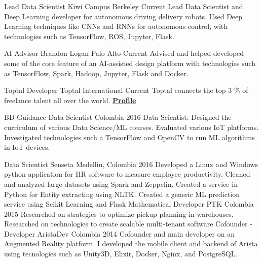 \begin{cventries}

  \cventry
    {Lead Data Scientist}
    {Kiwi Campus}
    {Berkeley}
    {Current}
    {
    Lead Data Scientist and Deep Learning developer for autonomous driving delivery robots. Used
    Deep Learning techniques like CNNs and RNNs for autonomous control,
    with technologies such as TensorFlow, ROS, Jupyter, Flask.
    }

  \cventry
    {AI Advisor}
    {Brandon Logan}
    {Palo Alto}
    {Current}
    {
    Advised and helped developed some of the core feature of an AI-assisted design platform
    with technologies such as TensorFlow, Spark, Hadoop, Jupyter, Flask and Docker.
    }

  \cventry
    {Toptal Developer }
    {Toptal}
    {International}
    { Current}
    {
      Toptal connects the top 3 \% of freelance talent all over the world. \href{https://www.toptal.com/resume/cristian-garcia}{\textbf{Profile}}
    }

  \cventry
    {BD Guidance}
    {Data Scientist}
    {Colombia}
    {2016}
    {
    Data Scientist: Designed the curriculum of various
    Data Science/ML courses. Evaluated various IoT platforms. Investigated
    technologies such a TensorFlow and OpenCV to run ML algorithms in IoT
    devices.
    }

  \cventry
    {Data Scientist}
    {Senseta}
    {Medellin, Colombia}
    {2016}
    {
    Developed a Linux and Windows python
    application for HR software to measure employee productivity. Cleaned
    and analyzed large datasets using Spark and Zeppelin. Created a service in
    Python for Entity extracting using NLTK. Created a generic ML prediction
    service using Scikit Learning and Flask
    }
  \cventry
    {Mathematical Developer}
    {PTK}
    {Colombia}
    {2015}
    {
    Researched on strategies to optimize
    pickup planning in warehouses. Researched on technologies to create
    scalable multi-tenant software
    }
  \cventry
    {Cofounder - Developer}
    {AristaDev}
    {Colombia}
    {2014 }
    {
    Cofounder and main developer on an
    Augmented Reality platform. I developed the mobile client and backend
    of Arista using tecnologies such as Unity3D, Elixir, Docker, Nginx, and
    PostgreSQL.
    }
\end{cventries}
